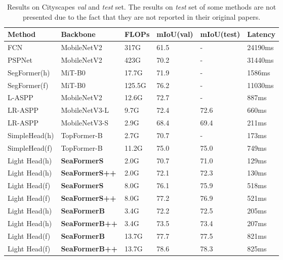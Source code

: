 \begin{table*}[tb]
    \centering
  
    \begin{tabular}[b]{L{2.5cm}  L{2.7cm} |R{1.1cm} C{1.3cm} C{1.3cm} R{1.4cm}}
    \hline

    \hline
    
    \hline
    Method     & Backbone     & FLOPs        & mIoU(val) & mIoU(test)  & Latency\\
    \hline

    \hline
    \hline
    FCN & MobileNetV2 & 317G & 61.5 & - &  24190ms\\
    PSPNet  &   MobileNetV2  & 423G & 70.2 & - & 31440ms\\
    SegFormer(h) & MiT-B0 & 17.7G & 71.9 & - & 1586ms\\
    SegFormer(f) & MiT-B0 & 125.5G & 76.2 & - & 11030ms\\
    L-ASPP & MobileNetV2       & 12.6G & 72.7  & - & 887ms \\
    LR-ASPP & MobileNetV3-L      & 9.7G & 72.4  & 72.6 & 660ms  \\
    LR-ASPP & MobileNetV3-S      & 2.9G & 68.4 & 69.4 & 211ms  \\
    SimpleHead(h) & TopFormer-B       &     2.7G      & 70.7   & - & 173ms    \\
    SimpleHead(f) & TopFormer-B       &     11.2G      & 75.0  & 75.0 & 749ms     \\
    \hline

    \hline
    \hline
    Light Head(h) & \textbf{SeaFormerS}       &   2.0G    & 70.7  & 71.0 & 129ms       \\
    Light Head(h) & \textbf{SeaFormerS++}       &   2.0G    & 72.1  & 72.3 & 130ms       \\
    Light Head(f) & \textbf{SeaFormerS}       &   8.0G    & 76.1  & 75.9 & 518ms        \\
    Light Head(f) & \textbf{SeaFormerS++}       &   8.0G    & 77.2  & 76.9 & 521ms       \\
    Light Head(h) & \textbf{SeaFormerB}       &   3.4G    & 72.2  & 72.5 & 205ms        \\
    Light Head(h) & \textbf{SeaFormerB++}       &   3.4G    & 73.5  & 73.4 & 207ms       \\
    Light Head(f) & \textbf{SeaFormerB}       &   13.7G    & 77.7 & 77.5 & 821ms         \\  
    Light Head(f) & \textbf{SeaFormerB++}       &   13.7G    & 78.6  & 78.3 & 825ms       \\
    \hline

    \hline
    
    \hline
  \end{tabular}
\caption{Results on Cityscapes \textit{val} and \textit{test} set. The results on \textit{test} set of some methods are not presented due to the fact that they are not reported in their original papers.}
\label{table_city}
\end{table*}